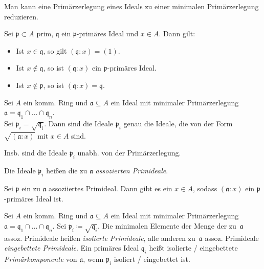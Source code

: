\documentclass{cheat-sheet}
\newcommand{\aaa}{\mathfrak{a}}
\newcommand{\ppp}{\mathfrak{p}}
\newcommand{\qqq}{\mathfrak{q}}
\begin{document}
\begin{kor}
  Man kann eine Primärzerlegung eines Ideals zu einer minimalen Primärzerlegung reduzieren.
\end{kor}

\begin{lem}
  Sei $\ppp \subset A$ prim, $\qqq$ ein $\ppp$-primäres Ideal und $x \in A$.
  Dann gilt:
  \begin{itemize}
    \item Ist $x \in \qqq$, so gilt $(\qqq : x) = (1)$.
    \item Ist $x \not\in \qqq$, so ist $(\qqq : x)$ ein $\ppp$-primäres Ideal.
    \item Ist $x \not\in \ppp$, so ist $(\qqq : x) = \qqq$.
  \end{itemize}
\end{lem}


\begin{satz}
  Sei $A$ ein komm. Ring und $\aaa \subseteq A$ ein Ideal mit minimaler Primärzerlegung $\aaa = \qqq_1 \cap \ldots \cap \qqq_n$. \\
  Sei $\ppp_i = \sqrt{\qqq_i}$.
  Dann sind die Ideale $\ppp_i$ genau die Ideale, die von der Form $\sqrt{(\aaa : x)}$ mit $x \in A$ sind.
\end{satz}

\begin{bem}
  Insb. sind die Ideale $\ppp_i$ unabh. von der Primärzerlegung.
\end{bem}

\begin{defn}
  Die Ideale $\ppp_i$ heißen die zu $\aaa$ \emph{assozierten Primideale}.
\end{defn}

\begin{lem}
  Sei $\ppp$ ein zu $\aaa$ assoziiertes Primideal.
  Dann gibt es ein $x \in A$, sodass $(\aaa : x)$ ein $\ppp$-primäres Ideal ist.
\end{lem}


\begin{defn}
  Sei $A$ ein komm. Ring und $\aaa \subseteq A$ ein Ideal mit minimaler Primärzerlegung $\aaa = \qqq_1 \cap \ldots \cap \qqq_n$.
  Sei $\ppp_i \coloneqq \sqrt{\qqq_i}$.
  Die minimalen Elemente der Menge der zu~$\aaa$ assoz. Primideale heißen \emph{isolierte Primideale}, alle anderen zu~$\aaa$ assoz. Primideale \emph{eingebettete Primideale}.
  Ein primäres Ideal $\qqq_i$ heißt isolierte / eingebettete \emph{Primärkomponente} von $\aaa$, wenn $\ppp_i$ isoliert / eingebettet ist.
\end{defn}
\end{document}
